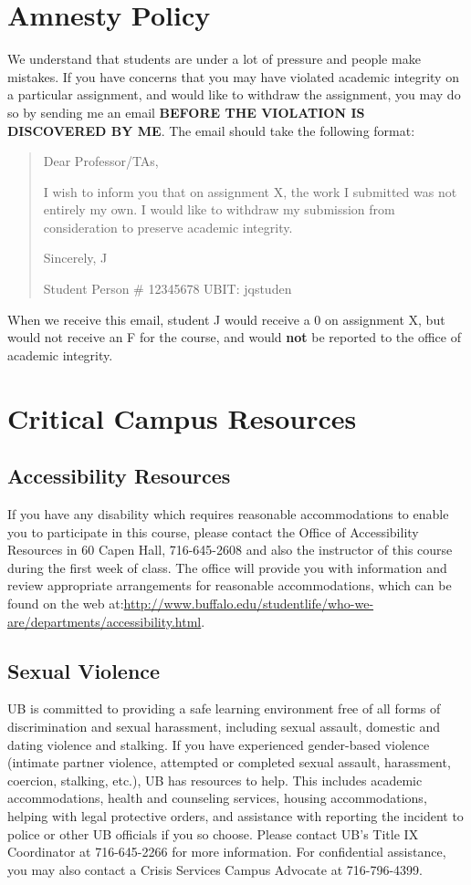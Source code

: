 \documentclass{article}
\begin{document}
\section{Amnesty Policy}
We understand that students are under a lot of pressure and people make mistakes. If you have concerns that you may have violated academic integrity on a particular assignment, and would like to withdraw the assignment, you may do so by sending me an email \textbf{BEFORE THE VIOLATION IS DISCOVERED BY ME}. The email should take the following format:
\begin{quote}
    Dear Professor/TAs,

    I wish to inform you that on assignment X, the work I submitted was not entirely my own. I would like to withdraw my submission from consideration to preserve academic integrity.

    Sincerely, J

    Student Person \# 12345678 UBIT: jqstuden
\end{quote}
When we receive this email, student J would receive a 0 on assignment X, but would not receive an F for the course, and would \textbf{not} be reported to the office of academic integrity.

\section{Critical Campus Resources}
\subsection{Accessibility Resources}
If you have any disability which requires reasonable accommodations to enable you to participate in this course, please contact the Office of Accessibility Resources in 60 Capen Hall, 716-645-2608 and also the instructor of this course during the first week of class. The office will provide you with information and review appropriate arrangements for reasonable accommodations, which can be found on the web at:\url{http://www.buffalo.edu/studentlife/who-we-are/departments/accessibility.html}.

\subsection{Sexual Violence}
UB is committed to providing a safe learning environment free of all forms of discrimination and sexual harassment, including sexual assault, domestic and dating violence and stalking. If you have experienced gender-based violence (intimate partner violence, attempted or completed sexual assault, harassment, coercion, stalking, etc.), UB has resources to help. This includes academic accommodations, health and counseling services, housing accommodations, helping with legal protective orders, and assistance with reporting the incident to police or other UB officials if you so choose. Please contact UB’s Title IX Coordinator at 716-645-2266 for more information. For confidential assistance, you may also contact a Crisis Services Campus Advocate at 716-796-4399.
\end{document}
